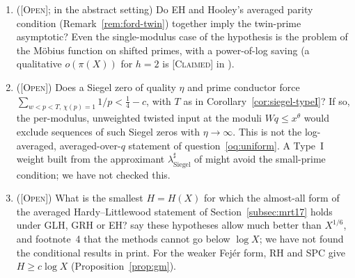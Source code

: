 \documentclass[11pt]{amsart}
\theoremstyle{definition}
\theoremstyle{remark}
\newcommand{\lbl}[1]{\textup{\textsc{[#1]}}}
\begin{document}
\begin{enumerate}
  marginal condition; Proposition~\ref{prop:orth-relax} shows the clean-column
  relaxation is too weak. Tools to try: alternating projections with an
  explicit rate, or a finite-element dual with error control.
\item (\lbl{Open}; \cite[p.~4]{Fo04} in the abstract setting) Do EH and Hooley's
  averaged parity condition (Remark~\ref{rem:ford-twin}) together imply the
  twin-prime asymptotic? Even the single-modulus case of the hypothesis is the
  problem of the M\"obius function on shifted primes, with a power-of-log
  saving (a qualitative $o(\pi(X))$ for $h=2$ is \lbl{Claimed} in \cite{LWW26}).
\item\label{oq:siegel} (\lbl{Open}) Does a Siegel zero of quality $\eta$ and prime
  conductor force $\sum_{w<p<T,\,\chi(p)=1}1/p<\frac14-c$, with $T$ as in
  Corollary~\ref{cor:siegel-typeI}? If so, the per-modulus, unweighted twisted input at the
  moduli $Wq\le x^{\theta}$ would exclude sequences of such Siegel zeros with
  $\eta\to\infty$. This is not the log-averaged, averaged-over-$q$ statement of
  question~\ref{oq:uniform}. A Type~I weight built from the approximant
  $\lambda^\sharp_{\mathrm{Siegel}}$ of \cite[\S6]{TT22} might avoid the
  small-prime condition; we have not checked this.
\item\label{oq:mrtcond} (\lbl{Open}) What is the smallest $H=H(X)$ for which the
  almost-all form of the averaged Hardy--Littlewood statement of
  Section~\ref{subsec:mrt17} holds under GLH, GRH or EH? \cite[p.~5]{MRT17} say
  these hypotheses allow much better than $X^{1/6}$, and footnote~4 that the
  methods cannot go below $\log X$; we have not found the conditional results
  in print. For the weaker Fej\'er form, RH and SPC give $H\ge c\log X$
  (Proposition~\ref{prop:gm}).
\end{enumerate}
\end{document}
